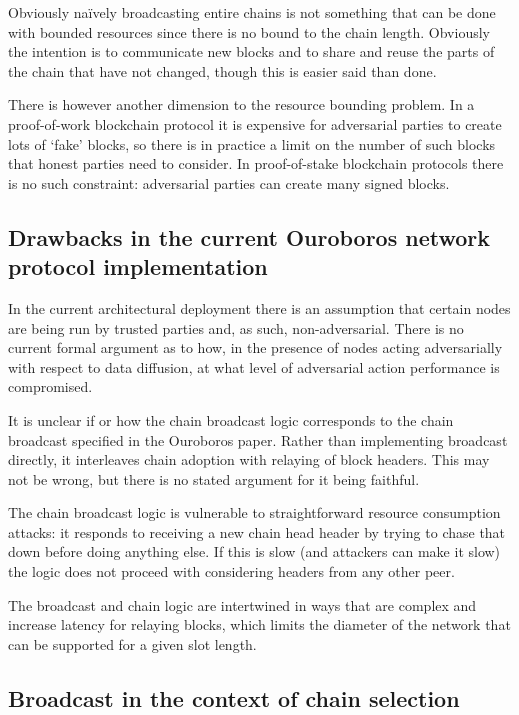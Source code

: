 \documentclass{article}
\theoremstyle{definition}{
  \newtheorem{lemma}{Lemma}[section] %
  \newtheorem{definition}[lemma]{Definition}
}
\theoremstyle{theorem}{
  \newtheorem{invariant}[lemma]{Invariant}
  \newtheorem{proofobligation}[lemma]{Proof Obligation}
}
\numberwithin{equation}{lemma}
\begin{document}
Obviously na\"ively broadcasting entire chains is not something that can be
done with bounded resources since there is no bound to the chain length.
Obviously the intention is to communicate new blocks and to share and reuse the
parts of the chain that have not changed, though this is easier said than done.

There is however another dimension to the resource bounding problem. In a
proof-of-work blockchain protocol it is expensive for adversarial parties to
create lots of `fake' blocks, so there is in practice a limit on the number of
such blocks that honest parties need to consider. In proof-of-stake blockchain
protocols there is no such constraint: adversarial parties can create many
signed blocks.

\subsection{Drawbacks in the current Ouroboros network protocol implementation}

In the current architectural deployment there is an assumption that certain
nodes are being run by trusted parties and, as such, non-adversarial. There is
no current formal argument as to how, in the presence of nodes acting
adversarially with respect to data diffusion, at what level of adversarial
action performance is compromised.

It is unclear if or how the chain broadcast logic corresponds to the chain
broadcast specified in the Ouroboros paper. Rather than implementing broadcast
directly, it interleaves chain adoption with relaying of block headers. This
may not be wrong, but there is no stated argument for it being faithful.

The chain broadcast logic is vulnerable to straightforward resource consumption
attacks: it responds to receiving a new chain head header by trying to chase
that down before doing anything else. If this is slow (and attackers can make
it slow) the logic does not proceed with considering headers from any other
peer.

The broadcast and chain logic are intertwined in ways that are complex and
increase latency for relaying blocks, which limits the diameter of the network
that can be supported for a given slot length.

\subsection{Broadcast in the context of chain selection}
\end{document}
